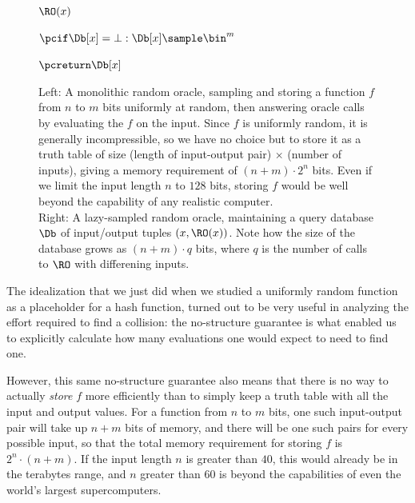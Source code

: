 \begin{figure}[t]
{    	  \begin{minipage}[t]{4.7cm}
    	  	\underline{\oracleHeading $\RO(x)$}
          \smallskip
    	  	\begin{nicodemus}
            \item $\pcif \Db[x] = \bot : \Db[x] \sample \bin^m$
            \smallskip
            \item $\pcreturn \Db[x]$
    	  	\end{nicodemus}	
    	  \end{minipage}
      }
      \caption{
        \label{fig:lazy-sampling}
        Left: A monolithic random oracle, sampling and storing a function $f$
        from $n$ to $m$ bits uniformly at random, then answering oracle calls by
        evaluating the $f$ on the input. Since $f$ is uniformly random, it is generally
        incompressible, so we have no choice but to store it as a truth table of size 
        (length of input-output pair) $\times$ (number of inputs),
        giving a memory requirement of $(n+m) \cdot 2^n$ bits. Even if we limit the input
        length $n$ to $128$ bits, storing $f$ would be well beyond the capability of any
        realistic computer. \\
        Right: A lazy-sampled random oracle, maintaining a
        query database $\Db$ of input/output tuples $(x,\RO(x))$. 
        Note how the size of the database grows as
        $(n+m) \cdot q$ bits, where $q$ is the number of calls to $\RO$ with
        differening inputs.
      }
    \end{figure}
    The idealization that we just did when we studied a uniformly random function
      as a placeholder for a hash function, turned out to be very useful in
      analyzing the effort required to find a collision: the no-structure
      guarantee is what enabled us to explicitly calculate how many evaluations
      one would expect to need to find one.

    However, this same no-structure guarantee also means that there is no way
      to actually \emph{store} $f$ more efficiently than to simply keep a
      truth table with all the input
      and output values. For a function from $n$ to $m$ bits, one such
      input-output pair will take up $n+m$ bits of memory, and there will be
      one such pairs for every possible input, so that the total memory
      requirement for storing $f$ is $2^n \cdot (n+m)$. If the input length $n$
      is greater than $40$, this would already be in the terabytes range, and
      $n$ greater than $60$ is
      beyond the capabilities of even the world's largest supercomputers.

